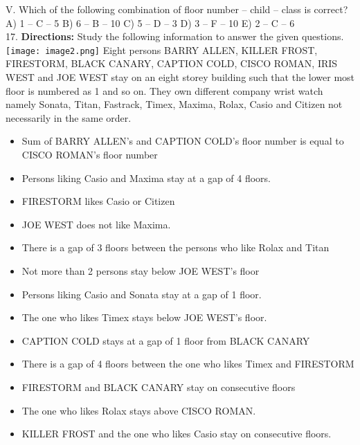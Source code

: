 \documentclass[
]{article}
\begin{document}
V. Which of the following combination of floor number – child – class is correct?\\
A) 1 – C – 5 \hspace{2mm}B) 6 – B – 10 \hspace{2mm}C) 5 – D – 3
\hspace{2mm}D) 3 – F – 10 \hspace{2mm}E) 2 – C – 6\\

17. \textbf{Directions:} Study the following information to answer the given questions.\\
\texttt{[image: image2.png]}
Eight persons BARRY ALLEN, KILLER FROST, FIRESTORM, BLACK CANARY, CAPTION
COLD, CISCO ROMAN, IRIS WEST and JOE WEST stay on an eight storey building such
that the lower most floor is numbered as 1 and so on. They own different company wrist
watch namely Sonata, Titan, Fastrack, Timex, Maxima, Rolax, Casio and Citizen not
necessarily in the same order.\\
\begin{itemize}
\item Sum of BARRY ALLEN's and CAPTION COLD's floor number is equal to CISCO
ROMAN's floor number
\item Persons liking Casio and Maxima stay at a gap of 4 floors.
\item FIRESTORM likes Casio or Citizen
\item JOE WEST does not like Maxima.
\item There is a gap of 3 floors between the persons who like Rolax and Titan
\item Not more than 2 persons stay below JOE WEST's floor
\item Persons liking Casio and Sonata stay at a gap of 1 floor.
\item The one who likes Timex stays below JOE WEST's floor.
\item CAPTION COLD stays at a gap of 1 floor from BLACK CANARY
\item There is a gap of 4 floors between the one who likes Timex and FIRESTORM
\item FIRESTORM and BLACK CANARY stay on consecutive floors
\item The one who likes Rolax stays above CISCO ROMAN.
\item KILLER FROST and the one who likes Casio stay on consecutive floors.\\
\end{itemize}
\end{document}

